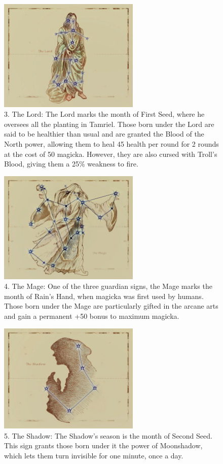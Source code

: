 \documentclass[12pt]{book}
\begin{document}
\begin{figure}[H]
\includegraphics[width=0.6\textwidth]{Lord.png}
\centering
\caption*{3. The Lord: The Lord marks the month of First Seed, where he oversees all the planting in Tamriel. Those born under the Lord are said to be healthier than usual and are granted the Blood of the North power, allowing them to heal 45 health per round for 2 rounds at the cost of 50 magicka. However, they are also cursed with Troll's Blood, giving them a 25\% weakness to fire.}
\end{figure}

\begin{figure}[H]
\includegraphics[width=0.6\textwidth]{Mage.png}
\centering
\caption*{4. The Mage: One of the three guardian signs, the Mage marks the month of Rain's Hand, when magicka was first used by humans. Those born under the Mage are particularly gifted in the arcane arts and gain a permanent +50 bonus to maximum magicka.}
\end{figure}

\begin{figure}[H]
\includegraphics[width=0.6\textwidth]{Shadow.png}
\centering
\caption*{5. The Shadow: The Shadow's season is the month of Second Seed. This sign grants those born under it the power of Moonshadow, which lets them turn invisible for one minute, once a day.}
\end{figure}
\end{document}
